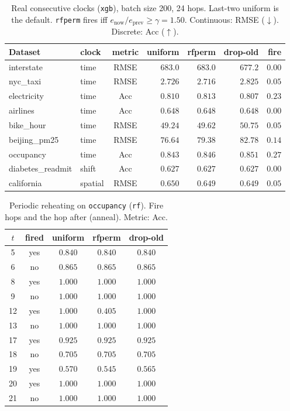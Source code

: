 \begin{table}[ht]\centering
\caption{Real consecutive clocks (\texttt{xgb}), batch size 200,
24 hops. Last-two uniform is the default. \texttt{rfperm} fires
iff $e_{\mathrm{now}}/e_{\mathrm{prev}}\ge\gamma=1.50$.
Continuous: RMSE ($\downarrow$). Discrete: Acc ($\uparrow$).}
\label{tab:po-refit-real-xgb}
\small
\setlength{\tabcolsep}{3.5pt}
\begin{tabular}{@{}llcrrrr@{}}\toprule
Dataset & clock & metric & uniform & rfperm & drop-old & fire \\
\midrule
interstate & time & RMSE & $683.0$ & $683.0$ & $\mathbf{677.2}$ & $0.00$ \\
nyc\_taxi & time & RMSE & $2.726$ & $\mathbf{2.716}$ & $2.825$ & $0.05$ \\
electricity & time & Acc & $0.810$ & $\mathbf{0.813}$ & $0.807$ & $0.23$ \\
airlines & time & Acc & $\mathbf{0.648}$ & $\mathbf{0.648}$ & $\mathbf{0.648}$ & $0.00$ \\
bike\_hour & time & RMSE & $\mathbf{49.24}$ & $49.62$ & $50.75$ & $0.05$ \\
beijing\_pm25 & time & RMSE & $\mathbf{76.64}$ & $79.38$ & $82.78$ & $0.14$ \\
occupancy & time & Acc & $0.843$ & $0.846$ & $\mathbf{0.851}$ & $0.27$ \\
diabetes\_readmit & shift & Acc & $\mathbf{0.627}$ & $\mathbf{0.627}$ & $\mathbf{0.627}$ & $0.00$ \\
california & spatial & RMSE & $0.650$ & $\mathbf{0.649}$ & $\mathbf{0.649}$ & $0.05$ \\
\bottomrule
\end{tabular}
\end{table}

\begin{table}[ht]\centering
\caption{Periodic reheating on \texttt{occupancy} (\texttt{rf}).
Fire hops and the hop after (anneal). Metric: Acc.}
\label{tab:po-refit-periodic-occupancy-rf}
\small
\begin{tabular}{@{}ccccc@{}}\toprule
$t$ & fired & uniform & rfperm & drop-old \\
\midrule
5 & yes & $0.840$ & $0.840$ & $0.840$ \\
6 & no & $0.865$ & $0.865$ & $0.865$ \\
8 & yes & $1.000$ & $1.000$ & $1.000$ \\
9 & no & $1.000$ & $1.000$ & $1.000$ \\
12 & yes & $1.000$ & $0.405$ & $1.000$ \\
13 & no & $1.000$ & $1.000$ & $1.000$ \\
17 & yes & $0.925$ & $0.925$ & $0.925$ \\
18 & no & $0.705$ & $0.705$ & $0.705$ \\
19 & yes & $0.570$ & $0.545$ & $0.565$ \\
20 & yes & $1.000$ & $1.000$ & $1.000$ \\
21 & no & $1.000$ & $1.000$ & $1.000$ \\
\bottomrule
\end{tabular}
\end{table}

